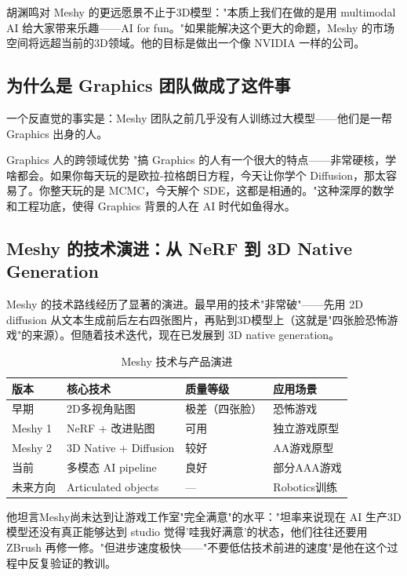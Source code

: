 胡渊鸣对 Meshy 的更远愿景不止于3D模型："本质上我们在做的是用 multimodal AI 给大家带来乐趣——AI for fun。"如果能解决这个更大的命题，Meshy 的市场空间将远超当前的3D领域。他的目标是做出一个像 NVIDIA 一样的公司。

\subsection{为什么是 Graphics 团队做成了这件事}

一个反直觉的事实是：Meshy 团队之前几乎没有人训练过大模型——他们是一帮 Graphics 出身的人。

\begin{knowledgebox}{Graphics 人的跨领域优势}
"搞 Graphics 的人有一个很大的特点——非常硬核，学啥都会。如果你每天玩的是欧拉-拉格朗日方程，今天让你学个 Diffusion，那太容易了。你整天玩的是 MCMC，今天解个 SDE，这都是相通的。"这种深厚的数学和工程功底，使得 Graphics 背景的人在 AI 时代如鱼得水。
\end{knowledgebox}

\subsection{Meshy 的技术演进：从 NeRF 到 3D Native Generation}

Meshy 的技术路线经历了显著的演进。最早用的技术"非常破"——先用 2D diffusion 从文本生成前后左右四张图片，再贴到3D模型上（这就是"四张脸恐怖游戏"的来源）。但随着技术迭代，现在已发展到 3D native generation。

\begin{table}[H]
\centering
\caption{Meshy 技术与产品演进}
\begin{tabular}{llll}
\toprule
\textbf{版本} & \textbf{核心技术} & \textbf{质量等级} & \textbf{应用场景} \\
\midrule
早期 & 2D多视角贴图 & 极差（四张脸） & 恐怖游戏 \\
Meshy 1 & NeRF + 改进贴图 & 可用 & 独立游戏原型 \\
Meshy 2 & 3D Native + Diffusion & 较好 & AA游戏原型 \\
当前 & 多模态 AI pipeline & 良好 & 部分AAA游戏 \\
未来方向 & Articulated objects & --- & Robotics训练 \\
\bottomrule
\end{tabular}
\end{table}

他坦言Meshy尚未达到让游戏工作室"完全满意"的水平："坦率来说现在 AI 生产3D模型还没有真正能够达到 studio 觉得'哇我好满意'的状态，他们往往还要用 ZBrush 再修一修。"但进步速度极快——"不要低估技术前进的速度"是他在这个过程中反复验证的教训。


